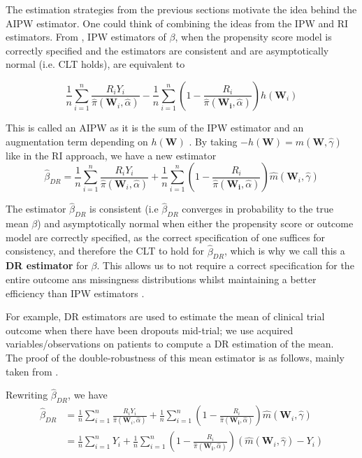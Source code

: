 \documentclass[12pt,twoside]{article}
\begin{document}
The estimation strategies from the previous sections motivate the idea behind the AIPW estimator. One could think of combining the ideas from the IPW and RI estimators. From \citet{davidian}, IPW estimators of $\beta$, when the propensity score model is correctly specified and the estimators are consistent and are asymptotically normal (i.e. CLT holds), are equivalent to 

\begin{equation}
    \frac{1}{n}\sum_{i=1}^{n}\frac{R_iY_i}{\hat\pi(\mathbf{W}_i, \hat{\alpha})} - \frac{1}{n}\sum_{i=1}^{n} \left(1 - \frac{R_i}{\hat\pi(\mathbf{W_i},\hat{\alpha})} \right) h(\mathbf{W}_i)
\end{equation}

This is called an AIPW as it is the sum of the IPW estimator and an augmentation term depending on $h(\mathbf{W})$ \citep{davidian}. By taking $-h(\mathbf{W}) = \hat m(\mathbf{W}, \hat{\gamma})$ like in the RI approach, we have a new estimator
\begin{equation}
    \hat\beta_{DR} = \frac{1}{n}\sum_{i=1}^{n}\frac{R_iY_i}{\hat \pi(\mathbf{W}_i, \hat{\alpha})} + \frac{1}{n}\sum_{i=1}^{n} \left(1 - \frac{R_i}{\hat\pi(\mathbf{W_i},\hat{\alpha})} \right) \hat m(\mathbf{W}_i, \hat\gamma)
\end{equation}

The estimator $\hat\beta_{DR}$ is consistent (i.e $\hat\beta_{DR}$ converges in probability to the true mean $\beta$) and asymptotically normal when either the propensity score or outcome model are correctly specified, as the correct specification of one suffices for consistency, and therefore the CLT to hold for $\hat\beta_{DR}$, which is why we call this a \textbf{DR estimator} for $\beta$. This allows us to not require a correct specification for the entire outcome ans missingness distributions whilst maintaining a better efficiency than IPW estimators \citep{bangrobins,vansteelandt}.

For example, DR estimators are used to estimate the mean of clinical trial outcome when there have been dropouts mid-trial; we use acquired variables/observations on patients to compute a DR estimation of the mean. \\

The proof of the double-robustness of this mean estimator is as follows, mainly taken from \citet{vansteelandt}.

Rewriting $\hat{\beta}_{DR}$, we have
\begin{align*}
    \hat{\beta}_{DR} & = \frac{1}{n}\sum_{i=1}^{n}\frac{R_iY_i}{\hat\pi(\mathbf{W}_i, \hat{\alpha})} + \frac{1}{n}\sum_{i=1}^{n} \left(1 - \frac{R_i}{\hat\pi(\mathbf{W_i},\hat{\alpha})} \right) \hat m(\mathbf{W}_i, \hat\gamma) \\
    & = \frac{1}{n}\sum_{i=1}^{n} Y_i + \frac{1}{n}\sum_{i=1}^{n}\left(1 - \frac{R_i}{\hat\pi(\mathbf{W_i},\hat{\alpha})} \right) (\hat m(\mathbf{W}_i, \hat\gamma)-Y_i)
\end{align*}
\end{document}
